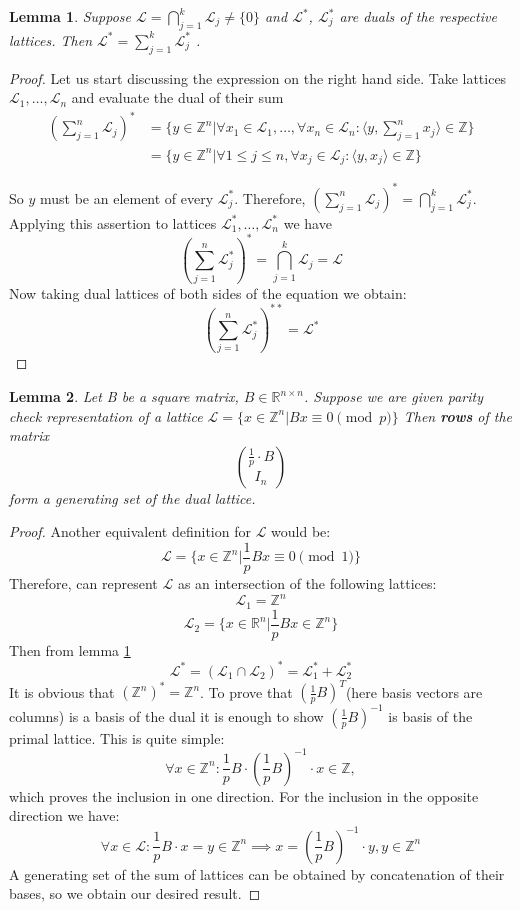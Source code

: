 \documentclass[12pt]{article}
\newcommand{\ZZ}{\mathbb{Z}}
\newcommand{\LL}{\mathcal{L}}
\newtheorem{lemma}{Lemma}
\begin{document}
\begin{lemma}
    \label{lemma_intersection}
    Suppose $\LL = \bigcap_{j=1}^{k} \LL_{j} \neq \{0\}$ and $\LL^{*}$, $\LL_{j}^{*}$ are duals of the respective lattices. Then $\LL^{*} = \sum_{j=1}^{k} \LL_{j}^{*}$ .
\end{lemma}
\begin{proof}
    Let us start discussing the expression on the right hand side. Take lattices $\LL_{1}, \dots, \LL_{n}$ and evaluate the dual of their sum
\[
\begin{split}
(\sum_{j=1}^{n}\LL_j)^{*} & = \{y \in \ZZ^{n} | \forall x_{1} \in \LL_1, \dots, \forall x_{n} \in \LL_n: \langle y, \sum_{j=1}^{n} x_{j} \rangle \in \ZZ \} \\
& = \{y \in \ZZ^{n} | \forall 1 \leq j \leq n, \forall x_{j} \in \LL_j: \langle y,  x_{j} \rangle \in \ZZ \}
\end{split}
\]

So $y$ must be an element of every $\LL_{j}^{*}$. Therefore, $(\sum_{j=1}^{n}\LL_j)^{*} = \bigcap_{j=1}^{k} \LL_{j}^{*}$. Applying this assertion to lattices $\LL_{1}^{*}, \dots, \LL_{n}^{*}$ we have
\[
(\sum_{j=1}^{n}\LL_j^{*})^{*} = \bigcap_{j=1}^{k} \LL_{j} = \LL
\]
Now taking dual lattices of both sides of the equation we obtain:
\[
(\sum_{j=1}^{n}\LL_j^{*})^{**} = \LL^{*}
\]

\end{proof}

\begin{lemma}\label{lemma:dual_gen_set}
    Let B be a square matrix, $B \in \mathbb{R}^{n \times n}$. Suppose we are given parity check representation of a lattice $\LL = \{x \in \ZZ^{n} | Bx \equiv 0 \pmod{p}\}$
    Then \textbf{rows} of the matrix
    \[
    \binom{\frac{1}{p} \cdot B}{I_{n}}
    \]
    form a generating set of the dual lattice.
\end{lemma}
\begin{proof}
    Another equivalent definition for $\LL$ would be:
    \[
        \LL  = \{x \in \ZZ^{n} | \frac{1}{p}Bx \equiv 0 \pmod{1}\}
    \]
Therefore, can represent $\LL$ as an intersection of the following lattices:
\[
    \LL_{1}  = \ZZ^{n}
\]
\[
    \LL_{2}  = \{x \in \mathbb{R}^{n} | \frac{1}{p}Bx \in \ZZ^{n} \}
\]
Then from lemma \ref{lemma_intersection}
\[
    \LL^{*}  = (\LL_{1} \cap \LL_{2})^{*} = \LL_{1}^{*} + \LL_{2}^{*}
\]
It is obvious that $(\ZZ^{n})^{*} = \ZZ^{n}$. To prove that $(\frac{1}{p}B)^{T}$(here basis vectors are columns) is a basis of the dual it is enough to show $(\frac{1}{p}B)^{-1}$ is basis of the primal lattice. This is quite simple:
\[
    \forall x \in \ZZ^{n}: \frac{1}{p}B \cdot (\frac{1}{p}B)^{-1} \cdot x \in \ZZ,
\]
which proves the inclusion in one direction. For the inclusion in the opposite direction we have:
\[
    \forall x \in \LL: \frac{1}{p}B \cdot x = y \in \ZZ^{n} \implies x = (\frac{1}{p}B)^{-1} \cdot y , y \in \ZZ^{n}
\]
A generating set of the sum of lattices can be obtained by concatenation of their bases, so we obtain our desired result.
\end{proof}
\end{document}
